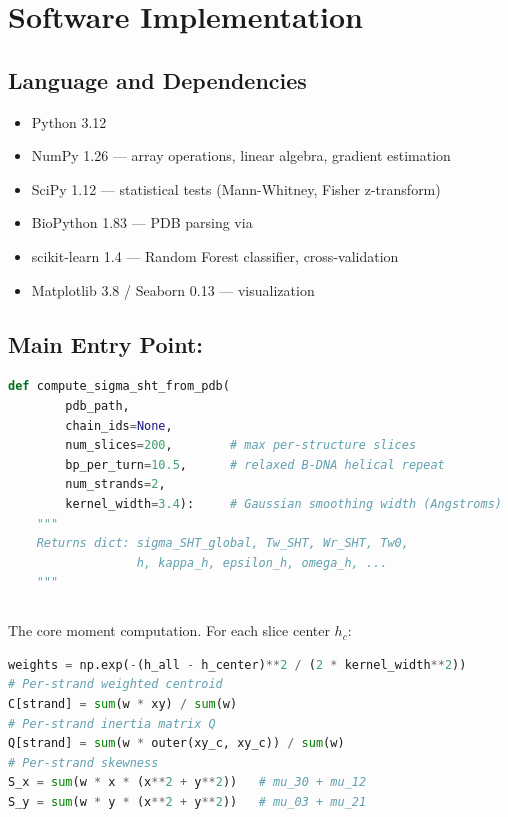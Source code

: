 \section{Software Implementation}

\subsection{Language and Dependencies}

\begin{itemize}
    \item Python 3.12
    \item NumPy 1.26 --- array operations, linear algebra, gradient estimation
    \item SciPy 1.12 --- statistical tests (Mann-Whitney, Fisher z-transform)
    \item BioPython 1.83 --- PDB parsing via 
    \item scikit-learn 1.4 --- Random Forest classifier, cross-validation
    \item Matplotlib 3.8 / Seaborn 0.13 --- visualization
\end{itemize}

\subsection{Main Entry Point: }

\begin{lstlisting}[language=Python, caption=Main SHT analysis function signature]
def compute_sigma_sht_from_pdb(
        pdb_path,
        chain_ids=None,
        num_slices=200,        # max per-structure slices
        bp_per_turn=10.5,      # relaxed B-DNA helical repeat
        num_strands=2,
        kernel_width=3.4):     # Gaussian smoothing width (Angstroms)
    """
    Returns dict: sigma_SHT_global, Tw_SHT, Wr_SHT, Tw0,
                  h, kappa_h, epsilon_h, omega_h, ...
    """
\end{lstlisting}

\subsection{}

The core moment computation. For each slice center $h_c$:

\begin{lstlisting}[language=Python, caption=Gaussian-kernel slice moments]
weights = np.exp(-(h_all - h_center)**2 / (2 * kernel_width**2))
# Per-strand weighted centroid
C[strand] = sum(w * xy) / sum(w)
# Per-strand inertia matrix Q
Q[strand] = sum(w * outer(xy_c, xy_c)) / sum(w)
# Per-strand skewness
S_x = sum(w * x * (x**2 + y**2))   # mu_30 + mu_12
S_y = sum(w * y * (x**2 + y**2))   # mu_03 + mu_21
\end{lstlisting}

